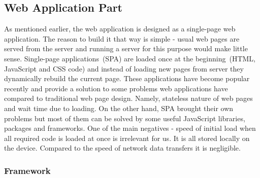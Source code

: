 \subsection{Web Application Part}

As mentioned earlier, the web application is designed as a single-page web application. The reason to build it that way is simple - usual web pages are served from the server and running a server for this purpose would make little sense. Single-page applications~(SPA) are loaded once at the beginning~(HTML, JavaScript and CSS code) and instead of loading new pages from server they dynamically rebuild the current page. These applications have become popular recently and provide a solution to some problems web applications have compared to traditional web page design. Namely, stateless nature of web pages and wait time due to loading. On the other hand, SPA brought their own problems but most of them can be solved by some useful JavaScript libraries, packages and frameworks. One of the main negatives - speed of initial load when all required code is loaded at once is irrelevant for us. It is all stored locally on the device. Compared to the speed of network data transfers it is negligible.

\subsubsection{Framework}

